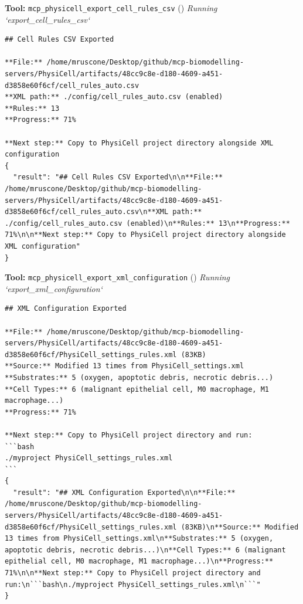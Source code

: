 \documentclass[11pt,a4paper]{article}
\begin{document}
\begin{toolokbox}
\textbf{Tool:} \texttt{mcp\_physicell\_export\_cell\_rules\_csv} (\checkmark)
\textit{Running `export\_cell\_rules\_csv`}
\begin{lstlisting}
## Cell Rules CSV Exported

**File:** /home/mruscone/Desktop/github/mcp-biomodelling-servers/PhysiCell/artifacts/48cc9c8e-d180-4609-a451-d3858e60f6cf/cell_rules_auto.csv
**XML path:** ./config/cell_rules_auto.csv (enabled)
**Rules:** 13
**Progress:** 71%

**Next step:** Copy to PhysiCell project directory alongside XML configuration
{
  "result": "## Cell Rules CSV Exported\n\n**File:** /home/mruscone/Desktop/github/mcp-biomodelling-servers/PhysiCell/artifacts/48cc9c8e-d180-4609-a451-d3858e60f6cf/cell_rules_auto.csv\n**XML path:** ./config/cell_rules_auto.csv (enabled)\n**Rules:** 13\n**Progress:** 71%\n\n**Next step:** Copy to PhysiCell project directory alongside XML configuration"
}
\end{lstlisting}
\end{toolokbox}
\begin{toolokbox}
\textbf{Tool:} \texttt{mcp\_physicell\_export\_xml\_configuration} (\checkmark)
\textit{Running `export\_xml\_configuration`}
\begin{lstlisting}
## XML Configuration Exported

**File:** /home/mruscone/Desktop/github/mcp-biomodelling-servers/PhysiCell/artifacts/48cc9c8e-d180-4609-a451-d3858e60f6cf/PhysiCell_settings_rules.xml (83KB)
**Source:** Modified 13 times from PhysiCell_settings.xml
**Substrates:** 5 (oxygen, apoptotic debris, necrotic debris...)
**Cell Types:** 6 (malignant epithelial cell, M0 macrophage, M1 macrophage...)
**Progress:** 71%

**Next step:** Copy to PhysiCell project directory and run:
```bash
./myproject PhysiCell_settings_rules.xml
```
{
  "result": "## XML Configuration Exported\n\n**File:** /home/mruscone/Desktop/github/mcp-biomodelling-servers/PhysiCell/artifacts/48cc9c8e-d180-4609-a451-d3858e60f6cf/PhysiCell_settings_rules.xml (83KB)\n**Source:** Modified 13 times from PhysiCell_settings.xml\n**Substrates:** 5 (oxygen, apoptotic debris, necrotic debris...)\n**Cell Types:** 6 (malignant epithelial cell, M0 macrophage, M1 macrophage...)\n**Progress:** 71%\n\n**Next step:** Copy to PhysiCell project directory and run:\n```bash\n./myproject PhysiCell_settings_rules.xml\n```"
}
\end{lstlisting}
\end{toolokbox}
\end{document}
